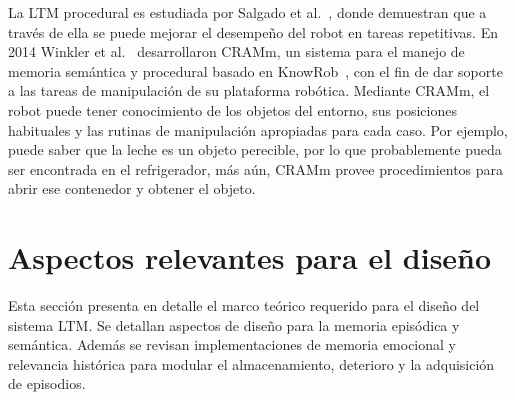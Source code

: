 La LTM procedural es estudiada por Salgado et al.~\cite{Salgado2012}, donde demuestran que a través de ella se puede mejorar el desempeño del robot en tareas repetitivas. En 2014 Winkler et al.~\cite{Winkler2014} desarrollaron CRAMm, un sistema para el manejo de memoria semántica y procedural basado en KnowRob~\cite{Tenorth2013}, con el fin de dar soporte a las tareas de manipulación de su plataforma robótica. Mediante CRAMm, el robot puede tener conocimiento de los objetos del entorno, sus posiciones habituales y las rutinas de manipulación apropiadas para cada caso. Por ejemplo, puede saber que la leche es un objeto perecible, por lo que probablemente pueda ser encontrada en el refrigerador, más aún, CRAMm provee procedimientos para abrir ese contenedor y obtener el objeto.









\section{Aspectos relevantes para el diseño}

Esta sección presenta en detalle el marco teórico requerido para el diseño del sistema LTM. Se detallan aspectos de diseño para la memoria episódica y semántica. Además se revisan implementaciones de memoria emocional y relevancia histórica para modular el almacenamiento, deterioro y la adquisición de episodios.

